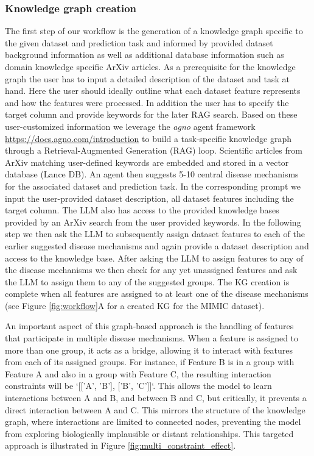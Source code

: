 \documentclass{article}
\begin{document}
\subsubsection{Knowledge graph creation}
The first step of our workflow is the generation of a knowledge graph specific to the given dataset and prediction task and informed by provided dataset background information as well as additional database information such as domain knowledge specific ArXiv articles. 
As a prerequisite for the knowledge graph the user has to input a detailed description of the dataset and task at hand. Here the user should ideally outline what each dataset feature represents and how the features were processed. In addition the user has to specify the target column and provide keywords for the later RAG search.
Based on these user-customized information we leverage the \emph{agno} agent framework \href{https://docs.agno.com/introduction}{https://docs.agno.com/introduction} to build a task-specific knowledge graph through a Retrieval-Augmented Generation (RAG) loop. Scientific articles from ArXiv matching user-defined keywords are embedded and stored in a vector database (Lance DB). An agent then suggests 5-10 central disease mechanisms for the associated dataset and prediction task. In the corresponding prompt we input the user-provided dataset description, all dataset features including the target column. The LLM also has access to the provided knowledge bases provided by an ArXiv search from the user provided keywords. In the following step we then ask the LLM to subsequently assign dataset features to each of the earlier suggested disease mechanisms and again provide a dataset description and access to the knowledge base. After asking the LLM to assign features to any of the disease mechanisms we then check for any yet unassigned features and ask the LLM to assign them to any of the suggested groups. The KG creation is complete when all features are assigned to at least one of the disease mechanisms (see Figure \ref{fig:workflow}A for a created KG for the MIMIC dataset).

An important aspect of this graph-based approach is the handling of features that participate in multiple disease mechanisms. When a feature is assigned to more than one group, it acts as a bridge, allowing it to interact with features from each of its assigned groups. For instance, if Feature B is in a group with Feature A and also in a group with Feature C, the resulting interaction constraints will be `[['A', 'B'], ['B', 'C']]`. This allows the model to learn interactions between A and B, and between B and C, but critically, it prevents a direct interaction between A and C. This mirrors the structure of the knowledge graph, where interactions are limited to connected nodes, preventing the model from exploring biologically implausible or distant relationships. This targeted approach is illustrated in Figure \ref{fig:multi_constraint_effect}.
\end{document}
